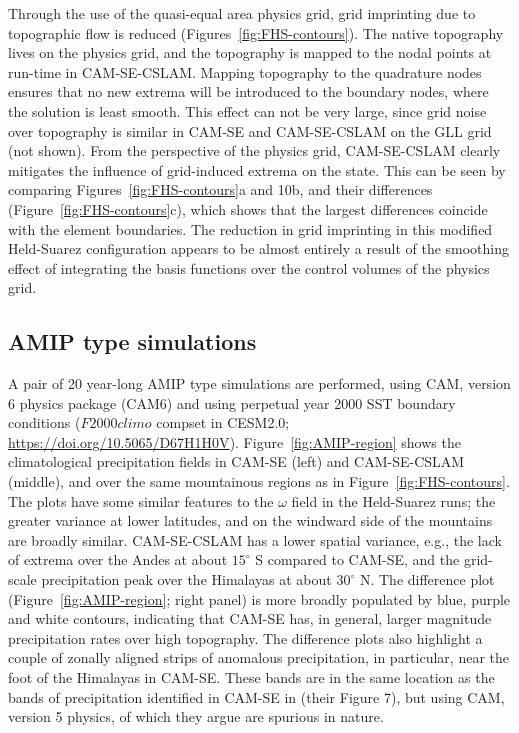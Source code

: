 \documentclass{ametsoc}
\begin{document}
{Through the use of the quasi-equal area physics grid, grid imprinting due to topographic flow is reduced (Figures~\ref{fig:FHS-contours}). The native topography lives on the physics grid, and the topography is mapped to the nodal points at run-time in CAM-SE-CSLAM. Mapping topography to the quadrature nodes ensures that no new extrema will be introduced to the boundary nodes, where the solution is least smooth. This effect can not be very large, since grid noise over topography is similar in CAM-SE and CAM-SE-CSLAM on the GLL grid (not shown). From the perspective of the physics grid, CAM-SE-CSLAM clearly mitigates the influence of grid-induced extrema on the state. This can be seen by comparing Figures~\ref{fig:FHS-contours}a and 10b, and their differences (Figure~\ref{fig:FHS-contours}c), which shows that the largest differences coincide with the element boundaries. The reduction in grid imprinting in this modified Held-Suarez configuration appears to be almost entirely a result of the smoothing effect of integrating the basis functions over the control volumes of the physics grid.

\subsection{AMIP type simulations}

A pair of 20 year-long AMIP type simulations are performed, using CAM, version 6 physics package (CAM6) and using perpetual year 2000 SST boundary conditions ($F2000climo$ compset in CESM2.0; \url{https://doi.org/10.5065/D67H1H0V}). Figure~\ref{fig:AMIP-region} shows the climatological precipitation fields in CAM-SE (left) and CAM-SE-CSLAM (middle), and over the same mountainous regions as in Figure~\ref{fig:FHS-contours}. The plots have some similar features to the $\omega$ field in the Held-Suarez runs; the greater variance at lower latitudes, and on the windward side of the mountains are broadly similar. CAM-SE-CSLAM has a lower spatial variance, e.g., the lack of extrema over the Andes at about $15^\circ$ S compared to CAM-SE, and the grid-scale precipitation peak over the Himalayas at about $30^\circ$ N. The difference plot (Figure~\ref{fig:AMIP-region}; right panel) is more broadly populated by blue, purple and white contours, indicating that CAM-SE has, in general, larger magnitude precipitation rates over high topography. The difference plots also highlight a couple of zonally aligned strips of anomalous precipitation, in particular, near the foot of the Himalayas in CAM-SE. These bands are in the same location as the bands of precipitation identified in CAM-SE in \cite{gmdd-8-4623-2015} (their Figure 7), but using CAM, version 5 physics, of which they argue are spurious in nature. 

}
\end{document}
